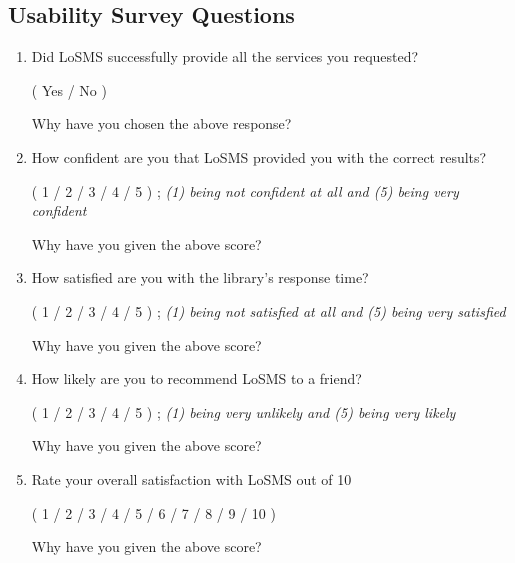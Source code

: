 \documentclass[12pt, titlepage]{article}
\newcommand{\famname}{LoSMS} %
\begin{document}
\subsection{Usability Survey Questions} \label{UsabilityTesting}

\begin{enumerate}
	\item Did \famname{} successfully provide all the services you requested?
	
	(	Yes	/	No	)
	
	Why have you chosen the above response?
	
	\item How confident are you that \famname{} provided you with the correct 
	results?
	
	(	1	/	2	/	3	/	4	/	5	) ; \textit{(1) being not confident 
	at all and (5) being very confident}

	Why have you given the above score?

	\item How satisfied are you with the library's response time?  
	
	(	1	/	2	/	3	/	4	/	5	) ; \textit{(1) being not satisfied 
	at all and (5) being very satisfied}

	Why have you given the above score?

	\item How likely are you to recommend \famname{} to a friend?
	
	(	1	/	2	/	3	/	4	/	5	) ; \textit{(1) being very unlikely 
	and (5) being very likely}

	Why have you given the above score?

	\item Rate your overall satisfaction with \famname{} out of 10 
	
	(	1	/	2	/	3	/	4	/	5	/	6	/	7	/	8	/	9	/	
	10	)
	
	Why have you given the above score?
\end {enumerate}

\end{document}
